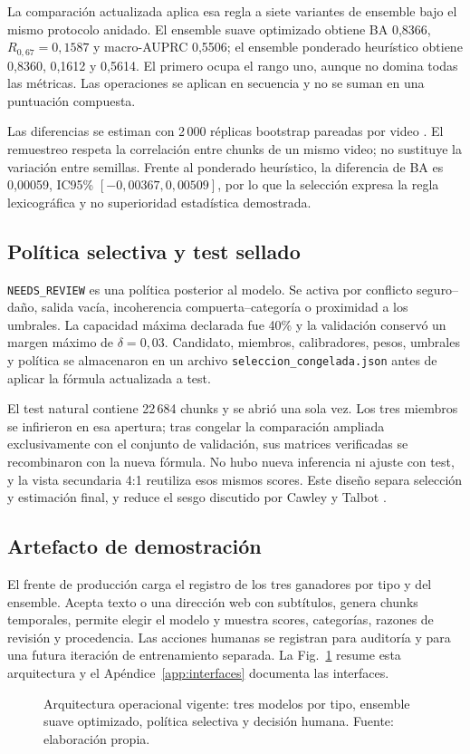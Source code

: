 La comparación actualizada aplica esa regla a siete variantes de ensemble bajo el mismo protocolo anidado. El ensemble suave optimizado obtiene BA 0,8366, $R_{0,67}=0,1587$ y macro-AUPRC 0,5506; el ensemble ponderado heurístico obtiene 0,8360, 0,1612 y 0,5614. El primero ocupa el rango uno, aunque no domina todas las métricas. Las operaciones se aplican en secuencia y no se suman en una puntuación compuesta.

Las diferencias se estiman con 2\,000 réplicas bootstrap pareadas por video \cite{efron1979bootstrap,field2007clusterbootstrap}. El remuestreo respeta la correlación entre chunks de un mismo video; no sustituye la variación entre semillas. Frente al ponderado heurístico, la diferencia de BA es 0,00059, IC95\% $[-0,00367,0,00509]$, por lo que la selección expresa la regla lexicográfica y no superioridad estadística demostrada.

\subsection{Política selectiva y test sellado}

\texttt{NEEDS\_REVIEW} es una política posterior al modelo. Se activa por conflicto seguro--daño, salida vacía, incoherencia compuerta--categoría o proximidad a los umbrales. La capacidad máxima declarada fue 40\% y la validación conservó un margen máximo de $\delta=0,03$. Candidato, miembros, calibradores, pesos, umbrales y política se almacenaron en un archivo \texttt{seleccion\_congelada.json} antes de aplicar la fórmula actualizada a test.

El test natural contiene 22\,684 chunks y se abrió una sola vez. Los tres miembros se infirieron en esa apertura; tras congelar la comparación ampliada exclusivamente con el conjunto de validación, sus matrices verificadas se recombinaron con la nueva fórmula. No hubo nueva inferencia ni ajuste con test, y la vista secundaria 4:1 reutiliza esos mismos scores. Este diseño separa selección y estimación final, y reduce el sesgo discutido por Cawley y Talbot \cite{cawley2010selection}.

\subsection{Artefacto de demostración}

El frente de producción carga el registro de los tres ganadores por tipo y del ensemble. Acepta texto o una dirección web con subtítulos, genera chunks temporales, permite elegir el modelo y muestra scores, categorías, razones de revisión y procedencia. Las acciones humanas se registran para auditoría y para una futura iteración de entrenamiento separada. La Fig.~\ref{fig:deploy} resume esta arquitectura y el Apéndice~\ref{app:interfaces} documenta las interfaces.

\begin{figure}[t]
\centering
\resizebox{\textwidth}{!}{}
\caption{Arquitectura operacional vigente: tres modelos por tipo, ensemble suave optimizado, política selectiva y decisión humana. Fuente: elaboración propia.}
\label{fig:deploy}
\end{figure}
